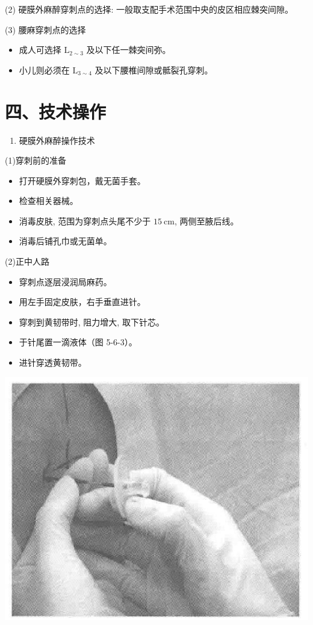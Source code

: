 \documentclass[10pt]{article}
\begin{document}
(2) 硬膜外麻醉穿刺点的选择: 一般取支配手术范围中央的皮区相应棘突间隙。

(3) 腰麻穿刺点的选择

\begin{itemize}
  \item 成人可选择 $\mathrm{L}_{2 \sim 3}$ 及以下任一棘突间弥。
  \item 小儿则必须在 $\mathrm{L}_{3 \sim 4}$ 及以下腰椎间隙或骶裂孔穿刺。
\end{itemize}

\section*{四、技术操作}
\begin{enumerate}
  \item 硬膜外麻醉操作技术
\end{enumerate}

(1)穿刺前的准备

\begin{itemize}
  \item 打开硬膜外穿刺包，戴无菌手套。
  \item 检查相关器械。
  \item 消毒皮肤, 范围为穿刺点头尾不少于 $15 \mathrm{~cm}$, 两侧至腋后线。
  \item 消毒后铺孔巾或无菌单。
\end{itemize}

(2)正中人路

\begin{itemize}
  \item 穿刺点逐层浸润局麻药。
  \item 用左手固定皮肤，右手垂直进针。
  \item 穿刺到黄韧带时, 阻力增大, 取下针芯。
  \item 于针尾置一滴液体（图 5-6-3）。
  \item 进针穿透黄韧带。
\end{itemize}

\begin{center}
\includegraphics[max width=\textwidth]{2024_07_05_645bb794a4d4f32ee0c8g-312}
\end{center}
\end{document}
